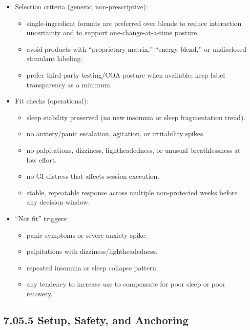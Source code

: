 \documentclass[10pt]{article}
\begin{document}
\begin{itemize}
\item Selection criteria (generic; non-prescriptive):
  \begin{itemize}
  \item single-ingredient formats are preferred over blends to reduce interaction uncertainty and to support one-change-at-a-time posture.
  \item avoid products with “proprietary matrix,” “energy blend,” or undisclosed stimulant labeling.
  \item prefer third-party testing/COA posture when available; keep label transparency as a minimum.
  \end{itemize}
\item Fit checks (operational):
  \begin{itemize}
  \item sleep stability preserved (no new insomnia or sleep fragmentation trend).
  \item no anxiety/panic escalation, agitation, or irritability spikes.
  \item no palpitations, dizziness, lightheadedness, or unusual breathlessness at low effort.
  \item no GI distress that affects session execution.
  \item stable, repeatable response across multiple non-protected weeks before any decision window.
  \end{itemize}
\item “Not fit” triggers:
  \begin{itemize}
  \item panic symptoms or severe anxiety spike.
  \item palpitations with dizziness/lightheadedness.
  \item repeated insomnia or sleep collapse pattern.
  \item any tendency to increase use to compensate for poor sleep or poor recovery.
  \end{itemize}
\end{itemize}

\subsection*{7.05.5 Setup, Safety, and Anchoring}
{}
\end{document}
